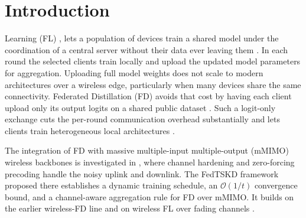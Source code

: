 \documentclass[journal]{IEEEtran}
\newcommand{\rev}[1]{#1}
\begin{document}
{\renewcommand{\abstractname}{Impact Statement}
\begin{abstract}
\rev{Wireless networks are starting to train shared artificial intelligence models across phones, wearables and vehicles. The data never leaves the device. Only a handful of devices can be served in each training round. Picking them at random means some devices contribute far more than others. Whose data shapes the model then becomes partly a matter of chance. This work replaces that lottery with a rotation. Its fairness follows from three quantities a network operator already knows. It can therefore be stated before a deployment is switched on. Operators give up no accuracy in exchange. Artificial intelligence systems are increasingly asked to evidence fair treatment of the people they serve. Committing to a participation guarantee in advance, rather than reporting one in hindsight, changes what a deployment can promise its users and its regulators.}
\end{abstract}}
\vspace{-1em}
\section{Introduction}
\label{sec:introduction}
 Learning (FL) \cite{mcmahan2017communication}, \cite{borazjani2026redefining} lets a population of devices train a shared model under the coordination of a central server without their data ever leaving them \cite{rao2025privacy, huang2024survey}. In each round the selected clients train locally and upload the updated model parameters for aggregation. Uploading full model weights does not scale to modern architectures over a wireless edge, particularly when many devices share the same connectivity. Federated Distillation (FD) \cite{jeong2018communication} avoids that cost by having each client upload only its output logits on a shared public dataset \cite{itahara2023distillation}. Such a logit-only exchange cuts the per-round communication overhead substantially and lets clients train heterogeneous local architectures \cite{sattler2022cfd, sattler2023fedaux, chan2021fedhe, cho2023clustered, wu2024fedict}.

The integration of FD with massive multiple-input multiple-output (mMIMO) wireless backbones is investigated in \cite{mu2024fedtskd}, where channel hardening and zero-forcing precoding handle the noisy uplink and downlink. The FedTSKD framework proposed there establishes a dynamic training schedule, an $\mathcal{O}(1/t)$ convergence bound, and a channel-aware aggregation rule for FD over mMIMO. It builds on the earlier wireless-FD line \cite{ahn2019wireless} and on wireless FL over fading channels \cite{amiri2020federated, vu2020cell}.
\end{document}
